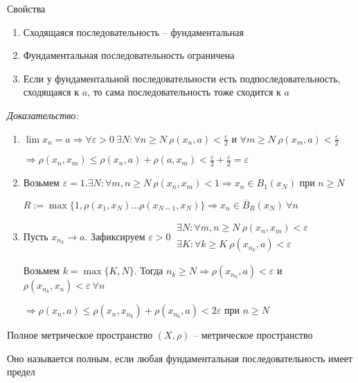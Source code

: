 \documentclass[12pt]{article}
\begin{document}
\begin{theo}{Свойства}
    \begin{enumerate}
        \item Сходящаяся последовательность -- фундаментальная
        \item Фундаментальная последовательность ограничена
        \item Если у фундаментальной последовательности есть подпоследовательность, сходящаяся к $a$, то сама последовательность тоже сходится к $a$
    \end{enumerate}
\end{theo}

\textit{Доказательство:}

\begin{enumerate}
    \item $\lim x_n = a \Rightarrow \forall \varepsilon > 0\ \exists N : \forall n \geq N\ \rho(x_n, a) < \frac{\varepsilon}{2}$ и $\forall m \geq N\ \rho(x_m, a) < \frac{\varepsilon}{2}$
    
    $\Rightarrow \rho(x_n, x_m) \leq \rho(x_n, a) + \rho(a, x_m) < \frac{\varepsilon}{2} + \frac{\varepsilon}{2} = \varepsilon$

    \item Возьмем $\varepsilon = 1. \exists N : \forall m, n \geq N\ \rho(x_n, x_m) < 1 \Rightarrow x_n \in B_1(x_N)$ при $n \geq N$
    
    $R := \max\{1, \rho(x_1, x_N) \ldots \rho(x_{N - 1}, x_N)\} \Rightarrow x_n \in \overline{B}_R(x_N)\ \forall n$

    \item Пусть $x_{n_k} \to a$. Зафиксируем $\varepsilon > 0\ \begin{gathered}
        \exists N : \forall m, n \geq N\ \rho(x_n, x_m) < \varepsilon \\
        \exists K : \forall k \geq K\ \rho(x_{n_k}, a) < \varepsilon
    \end{gathered}$

    Возьмем $k = \max\{K, N\}$. Тогда $n_k \geq N \Rightarrow \rho(x_{n_k}, a) < \varepsilon$ и $\rho(x_{n_k}, x_n) < \varepsilon\ \forall n$

    $\Rightarrow \rho(x_n, a) \leq \rho(x_n, x_{n_k}) + \rho(x_{n_k}, a) < 2\varepsilon$ при $n \geq N$
\end{enumerate}

\begin{defin}{Полное метрическое пространство}
    $(X, \rho)$ -- метрическое пространство

    Оно называется полным, если любая фундаментальная последовательность имеет предел
\end{defin}
\end{document}
